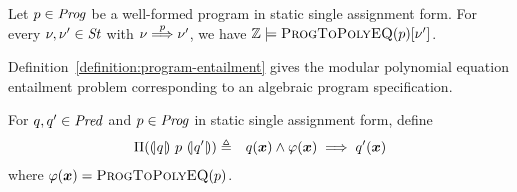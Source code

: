 \begin{theorem}
  Let $p \in \mathit{Prog}$ be a well-formed program in static single assignment
  form. For every $\nu, \nu' \in \mathit{St}$ with $\nu \overset{p}{\Longrightarrow} \nu'$, 
  we have $\mathbb{Z} \models \textsc{ProgToPolyEQ}(p) [\nu']$.
\end{theorem}

Definition~\ref{definition:program-entailment} gives the modular
polynomial equation entailment problem corresponding to an algebraic
program specification.
\begin{definition}
  For $q, q' \in \mathit{Pred}$ and $p \in \mathit{Prog}$ in static single assignment
  form, define
  \begin{eqnarray*}
    \Pi(\hoaretriple{q}{p}{q'}) & \defn &
    q(\vx) \wedge \varphi(\vx) \implies q'(\vx)
  \end{eqnarray*}
  where $\varphi(\vx) =
  \textsc{ProgToPolyEQ}(p)$. 
  \label{definition:program-entailment}
\end{definition}


